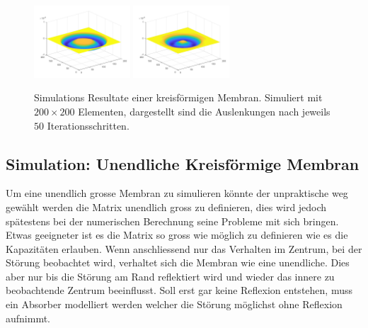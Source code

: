 \begin{figure}
\begin{center}
		\includegraphics[width=0.32\textwidth]{papers/kreismembran/images/sim_1_5.png}
		\includegraphics[width=0.32\textwidth]{papers/kreismembran/images/sim_1_6.png}
		\caption{Simulations Resultate einer kreisförmigen Membran. Simuliert mit $ 200 \times 200 $ Elementen, dargestellt sind die Auslenkungen nach jeweils $ 50 $ Iterationsschritten.}
		
	\end{center}	
\end{figure} 
\subsection{Simulation: Unendliche Kreisförmige Membran}

Um eine unendlich grosse Membran zu simulieren könnte der unpraktische weg gewählt werden die Matrix unendlich gross zu definieren, dies wird jedoch spätestens bei der numerischen Berechnung seine Probleme mit sich bringen.
Etwas geeigneter ist es die Matrix so gross wie möglich zu definieren wie es die Kapazitäten erlauben.
Wenn anschliessend nur das Verhalten im Zentrum, bei der Störung beobachtet wird, verhaltet sich die Membran wie eine unendliche. 
Dies aber nur bis die Störung am Rand reflektiert wird und wieder das innere zu beobachtende Zentrum beeinflusst.
Soll erst gar keine Reflexion entstehen, muss ein Absorber modelliert werden welcher die Störung möglichst ohne Reflexion aufnimmt.

